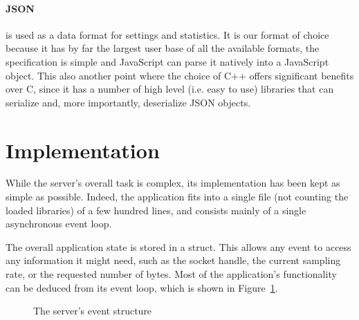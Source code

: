 \paragraph{JSON} is used  as a data format for settings  and statistics. It is
our format of  choice because it has by  far the largest user base  of all the
available formats,  the specification  is simple and  JavaScript can  parse it
natively into a JavaScript object. This also another point where the choice of
C++ offers significant  benefits over C, since  it has a number  of high level
(i.e.  easy to use)  libraries  that  can  serialize  and,  more  importantly,
deserialize JSON objects.

%
%
\section{Implementation} %
\label{sec:server:implementation}

While the server's  overall task is complex, its implementation  has been kept
as simple  as possible. Indeed, the application  fits into a single  file (not
counting the loaded libraries) of a  few hundred lines, and consists mainly of
a single asynchronous event loop.

The overall application state is stored  in a struct. This allows any event to
access any information  it might need, such as the  socket handle, the current
sampling rate,  or the requested number  of bytes.  Most of  the application's
functionality  can  be  deduced  from  its  event  loop,  which  is  shown  in
Figure~\ref{fig:server:eventstructure}.

\begin{figure}
    \centering
    
    \caption[Server Event Structure]{%
        The server's event structure%
    }
    \label{fig:server:eventstructure}
\end{figure}

